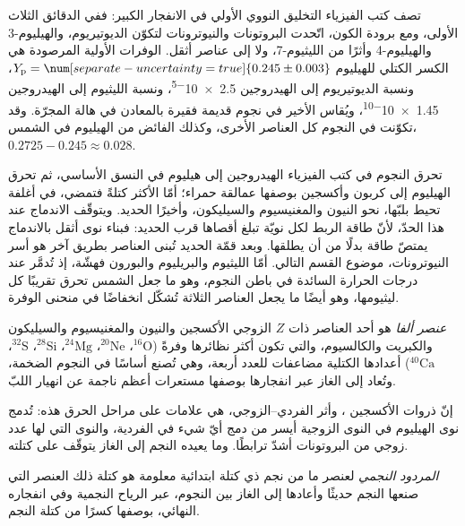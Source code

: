 تصف كتب الفيزياء التخليق النووي الأولي في الانفجار الكبير: ففي الدقائق الثلاث الأولى،
ومع برودة الكون، اتّحدت البروتونات والنيوترونات لتكوّن الديوتيريوم،
والهيليوم-3 والهيليوم-4 وأثرًا من الليثيوم-7، ولا إلى عناصر أثقل.
الوفرات الأولية المرصودة هي الكسر الكتلي للهيليوم
$Y_\mathrm{p} = \num[separate-uncertainty=true]{0.245 \pm 0.003}$، ونسبة الديوتيريوم إلى الهيدروجين
\num{2.5e-5}، ونسبة الليثيوم إلى الهيدروجين
\num{1.45e-10}، ويُقاس الأخير في نجوم قديمة فقيرة بالمعادن في هالة المجرّة.
وقد تكوّنت في النجوم كل العناصر الأخرى، وكذلك الفائض من الهيليوم في الشمس،
$0.2725 - 0.245 \approx 0.028$.

تحرق النجوم في كتب الفيزياء الهيدروجين إلى هيليوم في النسق الأساسي،
ثم تحرق الهيليوم إلى كربون وأكسجين بوصفها عمالقة حمراء؛ أمّا الأكثر كتلةً فتمضي،
في أغلفة تحيط بلبّها، نحو النيون والمغنيسيوم والسيليكون، وأخيرًا الحديد.
ويتوقّف الاندماج عند هذا الحدّ، لأنّ طاقة الربط لكل نويّة تبلغ أقصاها قرب الحديد:
فبناء نوى أثقل بالاندماج يمتصّ طاقة بدلًا من أن يطلقها.
وبعد قمّة الحديد تُبنى العناصر بطريق آخر هو أسر النيوترونات،
موضوع القسم التالي. أمّا الليثيوم والبريليوم والبورون فهشّة،
إذ تُدمَّر عند درجات الحرارة السائدة في باطن النجوم،
وهو ما جعل الشمس تحرق تقريبًا كل ليثيومها،
وهو أيضًا ما يجعل العناصر الثلاثة
تُشكّل انخفاضًا في منحنى الوفرة.

\begin{definition}\label{def:b3:origin-of-elements:alpha}
\emph{عنصر ألفا} هو أحد العناصر ذات $Z$ الزوجي
الأكسجين والنيون والمغنيسيوم والسيليكون والكبريت والكالسيوم، والتي
تكون أكثر نظائرها وفرةً ($^{16}\mathrm{O}$، $^{20}\mathrm{Ne}$،
$^{24}\mathrm{Mg}$، $^{28}\mathrm{Si}$، $^{32}\mathrm{S}$،
$^{40}\mathrm{Ca}$) أعدادها الكتلية مضاعفات للعدد أربعة، وهي
تُصنع أساسًا في النجوم الضخمة، وتُعاد إلى الغاز عبر انفجارها
بوصفها مستعرات أعظم ناجمة عن انهيار اللبّ.
\end{definition}

إنّ ذروات الأكسجين ، وأثر الفردي--الزوجي، هي علامات
على مراحل الحرق هذه: تُدمج نوى الهيليوم في النوى الزوجية أيسر
من دمج أيّ شيء في الفردية، والنوى التي لها عدد زوجي من البروتونات
أشدّ ترابطًا. وما يعيده النجم
إلى الغاز يتوقّف على كتلته.

\begin{definition}\label{def:b3:origin-of-elements:yield}
\emph{المردود النجمي} لعنصر ما من نجم ذي كتلة ابتدائية معلومة
هو كتلة ذلك العنصر التي صنعها النجم
حديثًا وأعادها إلى الغاز بين النجوم، عبر الرياح النجمية وفي انفجاره
النهائي، بوصفها كسرًا من كتلة النجم.
\end{definition}

